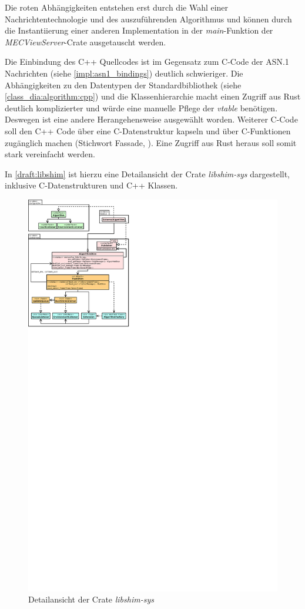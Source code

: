 Die roten Abhängigkeiten entstehen erst durch die Wahl einer Nachrichtentechnologie und des auszuführenden Algorithmus und können durch die Instantiierung einer anderen Implementation in der \textit{main}-Funktion der \textit{MECViewServer}-Crate ausgetauscht werden.


Die Einbindung des C++ Quellcodes ist im Gegensatz zum C-Code der ASN.1 Nachrichten (siehe \autoref{impl:asn1_bindings}) deutlich schwieriger.
Die Abhängigkeiten zu den Datentypen der Standardbibliothek (siehe \autoref{class_dia:algorithm:cpp}) und die Klassenhierarchie macht einen Zugriff aus Rust deutlich komplizierter und würde eine manuelle Pflege der \textit{vtable} benötigen.
Deswegen ist eine andere Herangehensweise ausgewählt worden.
Weiterer C-Code soll den C++ Code über eine C-Datenstruktur kapseln und über C-Funktionen zugänglich machen (Stichwort Fassade, \cite[700]{goll2018entwurfsprinzipien}).
Eine Zugriff aus Rust heraus soll somit stark vereinfacht werden.

In \autoref{draft:libshim} ist hierzu eine Detailansicht der Crate \textit{libshim-sys} dargestellt, inklusive C-Datenstrukturen und C++ Klassen.

\begin{figure}[H]
	\centering
	\includegraphics[width=2.5\textwidth]{dia/libshim}
	\caption{Detailansicht der Crate \textit{libshim-sys}}
	\label{draft:libshim}
\end{figure}

